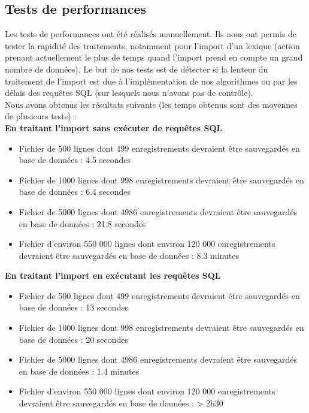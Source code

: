 \documentclass[12pt,a4paper]{article}
\begin{document}
\subsection{Tests de performances}

Les tests de performances ont été réalisés manuellement. Ils nous ont permis de tester la rapidité des traitements, notamment pour l'import d'un lexique (action prenant actuellement le plus de temps quand l'import prend en compte un grand nombre de données).
Le but de nos tests est de détecter si la lenteur du traitement de l'import est due à l'implémentation de nos algorithmes ou par les délais des requêtes SQL (sur lesquels nous n'avons pas de contrôle). \\
Nous avons obtenus les résultats suivants (les temps obtenus sont des moyennes de plusieurs tests) : \\
\textbf{En traitant l'import sans exécuter de requêtes SQL} \\
\begin{itemize}
  \item Fichier de 500 lignes dont 499 enregistrements devraient être sauvegardés en base de données : 4.5 secondes
  \item Fichier de 1000 lignes dont 998 enregistrements devraient être sauvegardés en base de données : 6.4 secondes
  \item Fichier de 5000 lignes dont 4986 enregistrements devraient être sauvegardés en base de données : 21.8 secondes
  \item Fichier d'environ 550 000 lignes dont environ 120 000 enregistrements devraient être sauvegardés en base de données : 8.3 minutes
\end{itemize}

\textbf{En traitant l'import en exécutant les requêtes SQL} \\
\begin{itemize}
  \item Fichier de 500 lignes dont 499 enregistrements devraient être sauvegardés en base de données : 13 secondes
  \item Fichier de 1000 lignes dont 998 enregistrements devraient être sauvegardés en base de données : 20 secondes
  \item Fichier de 5000 lignes dont 4986 enregistrements devraient être sauvegardés en base de données : 1.4 minutes
  \item Fichier d'environ 550 000 lignes dont environ 120 000 enregistrements devraient être sauvegardés en base de données : > 2h30
\end{itemize}
\end{document}

